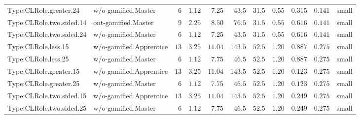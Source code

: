 \documentclass[6pt,a4paper]{article}
\begin{document}
{\begin{longtable}{llrrrrrrrrl}
Type:CLRole.greater.24&w/o-gamified.Master&$ 6$&$1.12$&$ 7.25$&$ 43.5$&$ 31.5$&$ 0.55$&$0.315$&$0.141$&small\tabularnewline
Type:CLRole.two.sided.14&ont-gamified.Master&$ 9$&$2.25$&$ 8.50$&$ 76.5$&$ 31.5$&$ 0.55$&$0.616$&$0.141$&small\tabularnewline
Type:CLRole.two.sided.24&w/o-gamified.Master&$ 6$&$1.12$&$ 7.25$&$ 43.5$&$ 31.5$&$ 0.55$&$0.616$&$0.141$&small\tabularnewline
Type:CLRole.less.15&w/o-gamified.Apprentice&$13$&$3.25$&$11.04$&$143.5$&$ 52.5$&$ 1.20$&$0.887$&$0.275$&small\tabularnewline
Type:CLRole.less.25&w/o-gamified.Master&$ 6$&$1.12$&$ 7.75$&$ 46.5$&$ 52.5$&$ 1.20$&$0.887$&$0.275$&small\tabularnewline
Type:CLRole.greater.15&w/o-gamified.Apprentice&$13$&$3.25$&$11.04$&$143.5$&$ 52.5$&$ 1.20$&$0.123$&$0.275$&small\tabularnewline
Type:CLRole.greater.25&w/o-gamified.Master&$ 6$&$1.12$&$ 7.75$&$ 46.5$&$ 52.5$&$ 1.20$&$0.123$&$0.275$&small\tabularnewline
\newpage
Type:CLRole.two.sided.15&w/o-gamified.Apprentice&$13$&$3.25$&$11.04$&$143.5$&$ 52.5$&$ 1.20$&$0.249$&$0.275$&small\tabularnewline
Type:CLRole.two.sided.25&w/o-gamified.Master&$ 6$&$1.12$&$ 7.75$&$ 46.5$&$ 52.5$&$ 1.20$&$0.249$&$0.275$&small\tabularnewline
\hline
\end{longtable}}
\end{document}
